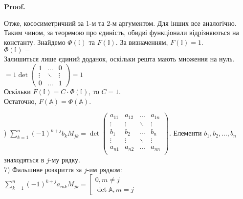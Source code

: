 \documentclass[a4paper, 10pt]{article}
\makeatletter
\theoremstyle{theoremdd}
\renewenvironment{proof}[1][Proof.\\]{\par
\pushQED{\hfill \qed}%
\normalfont \topsep6\p@\@plus6\p@\relax
\trivlist
\item\relax
{\bfseries
#1\@addpunct{.}}\hspace\labelsep\ignorespaces
}{%
\popQED\endtrivlist\@endpefalse
}
\makeatother
\begin{document}
\begin{proof}
Отже, кососиметричний за 1-м та 2-м аргументом. Для інших все аналогічно.
\bigskip \\
Таким чином, за теоремою про єдиність, обидві функціонали відрізняються на константу. Знайдемо $\Phi(\mathbb{I})$ та $F(\mathbb{I})$. За визначенням, $F(\mathbb{I}) = 1$.\\
$\Phi(\mathbb{I}) =$\\
Залишиться лише єдиний доданок, оскільки решта мають множення на нуль.\\
$= 1 \det \begin{pmatrix} 1 & \dots & 0 \\ \vdots & \ddots & \vdots \\ 0 & \dots & 1 \end{pmatrix} = 1$\\
Оскільки $F(\mathbb{I}) = C\cdot \Phi(\mathbb{I})$, то $C = 1$.\\
Остаточно, $F(\mathbb{A}) = \Phi(\mathbb{A})$.
\end{proof}

) $\displaystyle\sum_{k=1}^n (-1)^{k+j} b_k M_{jk} = \det \begin{pmatrix}
a_{11} & a_{12} & \dots & a_{1n} \\
\vdots & \vdots & \ddots & \vdots \\
b_1 & b_2 & \dots & b_n \\
\vdots & \vdots & \ddots & \vdots \\
a_{n1} & a_{n2} & \dots & a_{nn} \\
\end{pmatrix}$. Елементи $b_1,b_2,\dots,b_n$ знаходяться в $j$-му рядку.
\bigskip \\
7) \textquotedbl Фальшиве\textquotedbl{} розкриття за $j$-им рядком: $\displaystyle \sum_{k=1}^n (-1)^{k+j} a_{mk}M_{jk} = \left[\begin{gathered} 0, m \neq j \\ \det \mathbb{A}, m = j \end{gathered} \right.$
\end{document}
